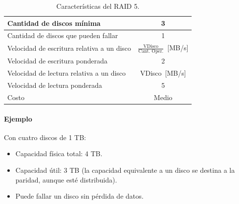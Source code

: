 \begin{table}[!ht]
  \centering
  \begin{tabular}{l|c}
    Cantidad de discos mínima & 3 \\\hline
    Cantidad de discos que pueden fallar & 1 \\ \hline
    Velocidad de escritura relativa a un disco & \(\frac{\text{VDisco}}{\text{Cant. Oper.}}\)~[MB/s] \\\hline
    Velocidad de escritura ponderada & 2 \\ \hline
    Velocidad de lectura relativa a un disco & VDisco~[MB/s] \\ \hline
    Velocidad de lectura ponderada & 5 \\ \hline
    Costo & Medio
  \end{tabular}
  \caption{Características del RAID 5.}
\end{table}

\paragraph{Ejemplo}
Con cuatro discos de 1 TB:
\begin{itemize}
  \item Capacidad física total: 4 TB.
  \item Capacidad útil: 3 TB (la capacidad equivalente a un disco se destina a la paridad, aunque esté distribuida).
  \item Puede fallar un disco sin pérdida de datos.
\end{itemize}
